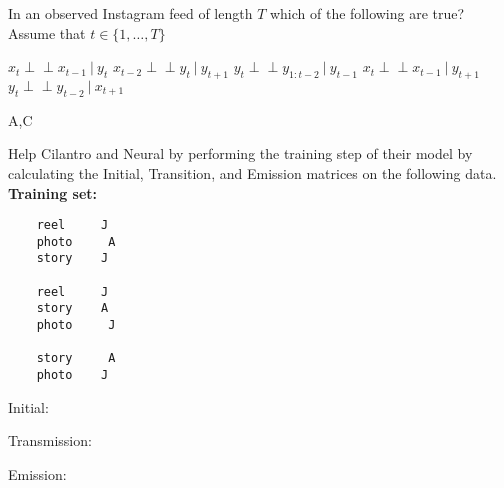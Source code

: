 \begin{parts}
\begin{subparts}
\subpart[2] In an observed Instagram feed of length $T$ which of the following are true? Assume that $t\in \{1,\dots,T\}$
\begin{checkboxes}
     \choice $x_t \perp \!\!\! \perp x_{t-1}\ |\ y_t$
     \choice $x_{t-2}\perp \!\!\! \perp y_t\ |\ y_{t+1}$
     \choice $y_t \perp \!\!\! \perp y_{1:t-2}\ |\ y_{t-1}$
     \choice $x_t \perp \!\!\! \perp x_{t-1}\ |\ y_{t+1}$
     \choice $y_t \perp \!\!\! \perp y_{t-2}\ |\ x_{t+1}$
    \end{checkboxes}
    \begin{soln}
    A,C
    \end{soln}
    
    \subpart[2] Help Cilantro and Neural by performing the training step of their model by calculating the Initial, Transition, and Emission matrices on the following data.\\
    
    \textbf{Training set:} 
    \begin{verbatim}
    reel     J
    photo     A
    story    J
    
    reel     J
    story    A
    photo     J
    
    story     A
    photo    J
    \end{verbatim}
    
    
    Initial:
    \begin{tcolorbox}[fit,height=3cm, width=5cm, blank, borderline={1pt}{-2pt}]
    \begin{soln}
    
    \end{soln}
    \end{tcolorbox}
    
    
    Transmission:
    \begin{tcolorbox}[fit,height=3cm, width=5cm, blank, borderline={1pt}{-2pt}]
    \begin{soln}
    
    \end{soln}
    \end{tcolorbox}
    
    
    Emission:
    \begin{tcolorbox}[fit,height=3cm, width=5cm, blank, borderline={1pt}{-2pt}]
    \begin{soln}
    
    \end{soln}
    \end{tcolorbox}



\end{subparts}
\end{parts}
